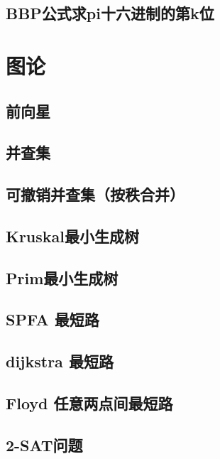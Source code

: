 \section{BBP公式求pi十六进制的第k位}
\raggedbottom
\hrulefill

\chapter{图论}
\section{前向星}
\raggedbottom
\hrulefill
\section{并查集}
\raggedbottom
\hrulefill
\section{可撤销并查集（按秩合并）}
\raggedbottom
\hrulefill
\section{Kruskal最小生成树}
\raggedbottom
\hrulefill
\section{Prim最小生成树}
\raggedbottom
\hrulefill
\section{SPFA 最短路}
\raggedbottom
\hrulefill
\section{dijkstra 最短路}
\raggedbottom
\hrulefill
\section{Floyd 任意两点间最短路}
\raggedbottom
\hrulefill
\section{2-SAT问题}
\raggedbottom
\hrulefill
